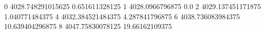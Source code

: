 0 4028.748291015625 0.651611328125
1 4028.0966796875 0.0
2 4029.137451171875 1.040771484375
4 4032.384521484375 4.287841796875
6 4038.736083984375 10.639404296875
8 4047.75830078125 19.66162109375
